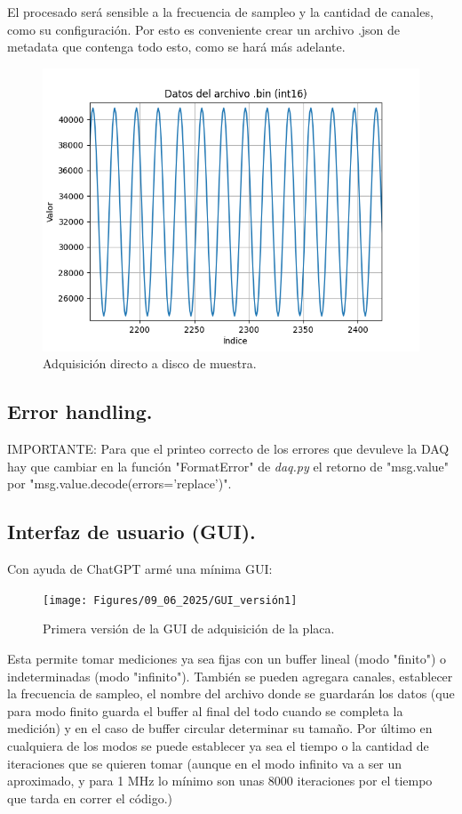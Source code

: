 El procesado será sensible a la frecuencia de sampleo y la cantidad de canales, como su configuración. Por esto es conveniente crear un archivo .json de metadata que contenga todo esto, como se hará más adelante.

\begin{figure}[th!]
	\centering
	\includegraphics[width=0.567\linewidth]{"Figures/09_06_2025/A disco directamente"}
	\caption{Adquisición directo a disco de muestra.}
	\label{fig:a-disco-directamente}
\end{figure}


\subsection*{Error handling.}
IMPORTANTE: Para que el printeo correcto de los errores que devuleve la DAQ hay que cambiar en la función "FormatError" de \textit{daq.py} el retorno de "msg.value" por "msg.value.decode(errors='replace')". %

\subsection*{Interfaz de usuario (GUI).} 
Con ayuda de ChatGPT armé una mínima GUI:

\begin{figure}[th!]
	\centering
	\texttt{[image: Figures/09\_06\_2025/GUI\_versión1]}
	\caption{Primera versión de la GUI de adquisición de la placa.}
	\label{fig:guiversion1}
\end{figure}

Esta permite tomar mediciones ya sea fijas con un buffer lineal (modo "finito") o indeterminadas (modo "infinito"). También se pueden agregara canales, establecer la frecuencia de sampleo, el nombre del archivo donde se guardarán los datos (que para modo finito guarda el buffer al final del todo cuando se completa la medición) y en el caso de buffer circular determinar su tamaño. Por último en cualquiera de los modos se puede establecer ya sea el tiempo o la cantidad de iteraciones que se quieren tomar (aunque en el modo infinito va a ser un aproximado, y para 1 MHz lo mínimo son unas 8000 iteraciones por el tiempo que tarda en correr el código.) 


